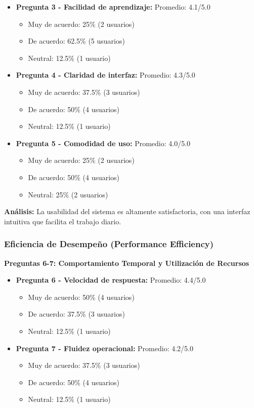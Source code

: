 \documentclass[conference]{IEEEtran}
\begin{document}
\begin{itemize}
    \item \textbf{Pregunta 3 - Facilidad de aprendizaje:} Promedio: 4.1/5.0
        \begin{itemize}
            \item Muy de acuerdo: 25\% (2 usuarios)
            \item De acuerdo: 62.5\% (5 usuarios)
            \item Neutral: 12.5\% (1 usuario)
        \end{itemize}
    \item \textbf{Pregunta 4 - Claridad de interfaz:} Promedio: 4.3/5.0
        \begin{itemize}
            \item Muy de acuerdo: 37.5\% (3 usuarios)
            \item De acuerdo: 50\% (4 usuarios)
            \item Neutral: 12.5\% (1 usuario)
        \end{itemize}
    \item \textbf{Pregunta 5 - Comodidad de uso:} Promedio: 4.0/5.0
        \begin{itemize}
            \item Muy de acuerdo: 25\% (2 usuarios)
            \item De acuerdo: 50\% (4 usuarios)
            \item Neutral: 25\% (2 usuarios)
        \end{itemize}
\end{itemize}

\textbf{Análisis:} La usabilidad del sistema es altamente satisfactoria, con una interfaz intuitiva que facilita el trabajo diario.

\subsubsection{Eficiencia de Desempeño (Performance Efficiency)}
\textbf{Preguntas 6-7: Comportamiento Temporal y Utilización de Recursos}

\begin{itemize}
    \item \textbf{Pregunta 6 - Velocidad de respuesta:} Promedio: 4.4/5.0
        \begin{itemize}
            \item Muy de acuerdo: 50\% (4 usuarios)
            \item De acuerdo: 37.5\% (3 usuarios)
            \item Neutral: 12.5\% (1 usuario)
        \end{itemize}
    \item \textbf{Pregunta 7 - Fluidez operacional:} Promedio: 4.2/5.0
        \begin{itemize}
            \item Muy de acuerdo: 37.5\% (3 usuarios)
            \item De acuerdo: 50\% (4 usuarios)
            \item Neutral: 12.5\% (1 usuario)
        \end{itemize}
\end{itemize}
\end{document}
